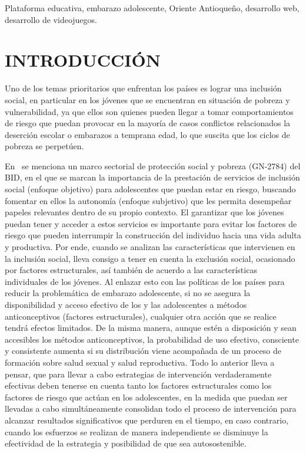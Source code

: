 \documentclass[a4paper]{article}
\begin{document}
 Plataforma educativa, embarazo adolescente, Oriente Antioqueño, desarrollo web, desarrollo de videojuegos.\newline

\section{INTRODUCCIÓN}

Uno de los temas prioritarios que enfrentan los países es lograr una inclusión social, en particular en los jóvenes que se encuentran en situación de pobreza y vulnerabilidad, ya que ellos son quienes pueden llegar a tomar comportamientos de riesgo que puedan provocar en la mayoría de casos conflictos relacionados la deserción escolar o embarazos a temprana edad, lo que suscita que los ciclos de pobreza se perpetúen.

En~\citep{BID2017} se menciona un marco sectorial de protección social y pobreza (GN-2784) del BID, en el que se marcan la importancia de la prestación de servicios de inclusión social (enfoque objetivo) para adolescentes que puedan estar en riesgo, buscando fomentar en ellos la autonomía (enfoque subjetivo) que les permita desempeñar papeles relevantes dentro de su propio contexto. El garantizar que los jóvenes puedan tener y acceder a estos servicios es importante para evitar los factores de riesgo que pueden interrumpir la construcción del individuo hacia una vida adulta y productiva. Por ende, cuando se analizan las características que intervienen en la inclusión social, lleva consigo a tener en cuenta la exclusión social, ocasionado por factores estructurales, así también de acuerdo a las características individuales de los jóvenes. Al enlazar esto con las políticas de los países para reducir la problemática de embarazo adolescente, si no se asegura la disponibilidad y acceso
efectivo de los y las adolescentes a métodos anticonceptivos (factores estructurales), cualquier otra acción que se realice tendrá efectos limitados. De la misma manera, aunque estén a disposición y sean accesibles los métodos anticonceptivos, la probabilidad de uso efectivo, consciente y consistente aumenta si su distribución viene acompañada de un proceso de formación sobre salud sexual y salud reproductiva. Todo lo anterior lleva a pensar, que para llevar a cabo estrategias de intervención verdaderamente efectivas deben tenerse en cuenta tanto los factores estructurales como los factores de riesgo que actúan en los adolescentes, en la medida que puedan ser llevadas a cabo simultáneamente consolidan todo el proceso de intervención para alcanzar resultados significativos que perduren en el tiempo, en caso contrario, cuando los esfuerzos se realizan de manera independiente se disminuye la efectividad de la estrategia y posibilidad de que sea autosostenible.
\end{document}
